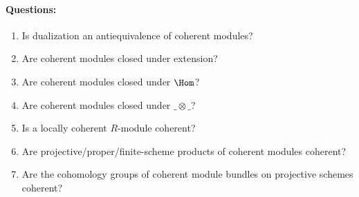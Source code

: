 \paragraph{Questions:}
\begin{enumerate}
\item Is dualization an antiequivalence of coherent modules?
\item Are coherent modules closed under extension?
\item Are coherent modules closed under $\Hom$?
\item Are coherent modules closed under $\_\otimes\_$?
\item \label{coherent-local} Is a locally coherent $R$-module coherent?
\item Are projective/proper/finite-scheme products of coherent modules coherent?
\item Are the cohomology groups of coherent module bundles on projective schemes coherent?
\end{enumerate}

